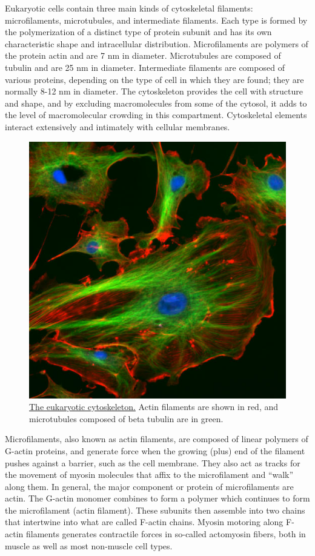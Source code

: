 Eukaryotic cells contain three main kinds of cytoskeletal filaments: microfilaments, microtubules, and intermediate filaments. Each type is formed by the polymerization of a distinct type of protein subunit and has its own characteristic shape and intracellular distribution. Microfilaments are polymers of the protein actin and are 7 nm in diameter. Microtubules are composed of tubulin and are 25 nm in diameter. Intermediate filaments are composed of various proteins, depending on the type of cell in which they are found; they are normally 8-12 nm in diameter. The cytoskeleton provides the cell with structure and shape, and by excluding macromolecules from some of the cytosol, it adds to the level of macromolecular crowding in this compartment. Cytoskeletal elements interact extensively and intimately with cellular membranes.



\begin{figure}

{\centering \includegraphics[width=0.7\linewidth]{./figures/cells/FluorescentCells} 

}

\caption{\href{https://commons.wikimedia.org/wiki/File:FluorescentCells.jpg}{The eukaryotic cytoskeleton.} Actin filaments are shown in red, and microtubules composed of beta tubulin are in green.}\label{fig:cytoskeleton}
\end{figure}

Microfilaments, also known as actin filaments, are composed of linear polymers of G-actin proteins, and generate force when the growing (plus) end of the filament pushes against a barrier, such as the cell membrane. They also act as tracks for the movement of myosin molecules that affix to the microfilament and ``walk'' along them. In general, the major component or protein of microfilaments are actin. The G-actin monomer combines to form a polymer which continues to form the microfilament (actin filament). These subunits then assemble into two chains that intertwine into what are called F-actin chains. Myosin motoring along F-actin filaments generates contractile forces in so-called actomyosin fibers, both in muscle as well as most non-muscle cell types.



